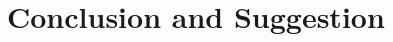 \chapter{Conclusion and Suggestion}
\setlength{\parskip}{12pt}
\setlength{\parindent}{10mm} 
\onehalfspacing
\label{conclusion}

\lipsum[1-7] %

